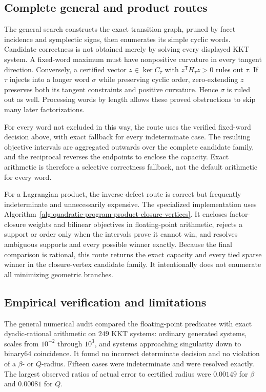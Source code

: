 \subsection{Complete general and product routes}

The general search constructs the exact transition graph, pruned by facet
incidence and symplectic signs, then enumerates its simple cyclic words. Candidate
correctness is not obtained merely by solving every displayed KKT system.  A
fixed-word maximum must have nonpositive curvature in every tangent direction.
Conversely, a certified vector \(z\in\ker C_\tau\) with
\(z^{\mathsf T}H_\tau z>0\) rules out \(\tau\).  If \(\tau\) injects into a
longer word \(\sigma\) while preserving cyclic order, zero-extending \(z\)
preserves both its tangent constraints and positive curvature.  Hence
\(\sigma\) is ruled out as well.  Processing words by length allows these
proved obstructions to skip many later factorizations.

For every word not excluded in this way, the route uses the verified
fixed-word decision above, with exact fallback for every indeterminate case.
The resulting objective intervals are aggregated outwards over the complete
candidate family, and the reciprocal reverses the endpoints to enclose the
capacity.  Exact arithmetic is therefore a selective correctness fallback,
not the default arithmetic for every word.

For a Lagrangian product, the inverse-defect route is correct but frequently
indeterminate and unnecessarily expensive.  The specialized implementation
uses Algorithm~\ref{alg:quadratic-program-product-closure-vertices}.  It
encloses factor-closure weights and bilinear objectives in floating-point
arithmetic, rejects a support or order only when the intervals prove it cannot
win, and resolves ambiguous supports and every possible winner exactly.
Because the final comparison is rational, this route returns the exact
capacity and every tied sparse winner in the closure-vertex candidate family.
It intentionally does not enumerate all minimizing geometric branches.

\subsection{Empirical verification and limitations}

The general numerical audit compared the floating-point predicates with exact
dyadic-rational arithmetic on \(249\) KKT systems: ordinary generated systems,
scales from \(10^{-2}\) through \(10^3\), and systems approaching singularity
down to binary64 coincidence.  It found no incorrect determinate decision and
no violation of a \(\beta\)- or \(Q\)-radius.  Fifteen cases were
indeterminate and were resolved exactly.  The largest observed ratios of
actual error to certified radius were \(0.00149\) for \(\beta\) and
\(0.00081\) for \(Q\).

